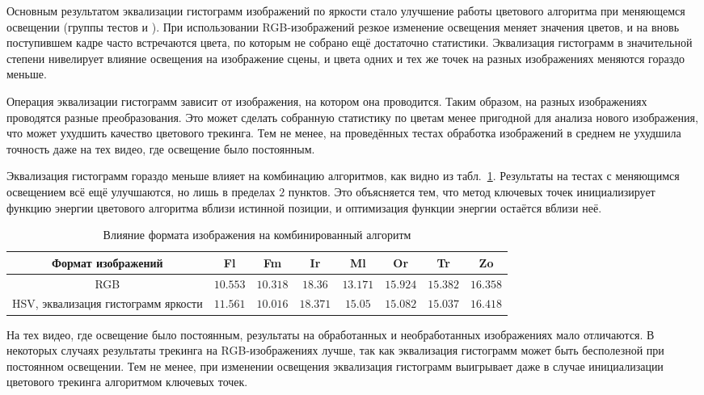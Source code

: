 Основным результатом эквализации гистограмм изображений по яркости стало
улучшение работы цветового алгоритма при меняющемся освещении (группы тестов
 и ).
При использовании RGB-изображений резкое изменение освещения меняет значения
цветов, и на вновь поступившем кадре часто встречаются цвета, по которым не
собрано ещё достаточно статистики.
Эквализация гистограмм в значительной степени нивелирует влияние освещения на
изображение сцены, и цвета одних и тех же точек на разных изображениях меняются
гораздо меньше.

Операция эквализации гистограмм зависит от изображения, на котором она
проводится.
Таким образом, на разных изображениях проводятся разные преобразования. 
Это может сделать собранную статистику по цветам менее пригодной для анализа
нового изображения, что может ухудшить качество цветового трекинга.
Тем не менее, на проведённых тестах обработка изображений в среднем не ухудшила
точность даже на тех видео, где освещение было постоянным.


Эквализация гистограмм гораздо меньше влияет на комбинацию алгоритмов, как
видно из табл.~\ref{tab:hsv_lkt_init}.
Результаты на тестах с меняющимся освещением всё ещё улучшаются, но лишь в
пределах $2$ пунктов.
Это объясняется тем, что метод ключевых точек инициализирует функцию энергии
цветового алгоритма вблизи истинной позиции, и оптимизация функции энергии
остаётся вблизи неё.

\begin{table}[h]
\caption{\label{tab:hsv_lkt_init}Влияние формата изображения на комбинированный
алгоритм}
\begin{center}
\begin{tabular}{|c|c|c|c|c|c|c|c|}
\hline
Формат изображений & Fl & Fm & Ir & Ml & Or & Tr & Zo \\
\hline
RGB & $10.553$ & $10.318$ & $18.36$ & $13.171$ & $15.924$ & $15.382$ & $16.358$
\\
\hline
HSV, эквализация гистограмм яркости & $11.561$ & $10.016$ & $18.371$ & $15.05$
& $15.082$ & $15.037$ & $16.418$ \\
\hline
\end{tabular}
\end{center}
\end{table}

На тех видео, где освещение было постоянным, результаты на обработанных и
необработанных изображениях мало отличаются.
В некоторых случаях результаты трекинга на RGB-изображениях лучше, так как
эквализация гистограмм может быть бесполезной при постоянном освещении.
Тем не менее, при изменении освещения эквализация гистограмм выигрывает даже в
случае инициализации цветового трекинга алгоритмом ключевых точек.



